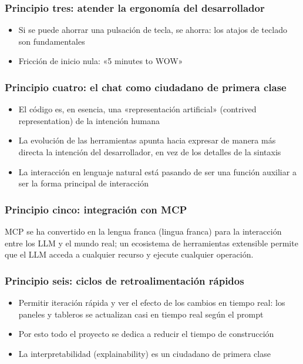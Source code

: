 \documentclass[a4paper]{article}
\begin{document}
\subsubsection{Principio tres: atender la ergonomía del desarrollador}

\begin{itemize}
    \item Si se puede ahorrar una pulsación de tecla, se ahorra: los atajos de teclado son fundamentales
    \item Fricción de inicio nula: «5 minutes to WOW»
\end{itemize}

\subsubsection{Principio cuatro: el chat como ciudadano de primera clase}

\begin{itemize}
    \item El código es, en esencia, una «representación artificial» (contrived representation) de la intención humana
    \item La evolución de las herramientas apunta hacia expresar de manera más directa la intención del desarrollador, en vez de los detalles de la sintaxis
    \item La interacción en lenguaje natural está pasando de ser una función auxiliar a ser la forma principal de interacción
\end{itemize}

\subsubsection{Principio cinco: integración con MCP}

MCP se ha convertido en la lengua franca (lingua franca) para la interacción entre los LLM y el mundo real; un ecosistema de herramientas extensible permite que el LLM acceda a cualquier recurso y ejecute cualquier operación.

\subsubsection{Principio seis: ciclos de retroalimentación rápidos}

\begin{itemize}
    \item Permitir iteración rápida y ver el efecto de los cambios en tiempo real: los paneles y tableros se actualizan casi en tiempo real según el prompt
    \item Por esto todo el proyecto se dedica a reducir el tiempo de construcción
    \item La interpretabilidad (explainability) es un ciudadano de primera clase
\end{itemize}
\end{document}

